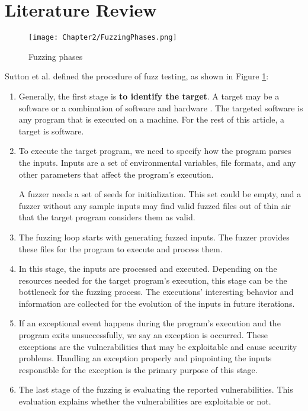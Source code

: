 \section{Literature Review} \label{sec:2.2}


\begin{figure}[!b]
    \texttt{[image: Chapter2/FuzzingPhases.png]}
    \centering
    \caption{Fuzzing phases}
    \label{fig:fuzz_phases}
\end{figure} 

Sutton et al. \cite{sutton2007fuzzing} defined the procedure of fuzz testing, as shown in Figure \ref{fig:fuzz_phases}:
\begin{enumerate}
    \item Generally, the first stage is \textbf{to identify the target}. A target may be a software or a combination of software and hardware \cite{song2019periscope}. The targeted software is any program that is executed on a machine. For the rest of this article, a target is software.
    
    \item To execute the target program, we need to specify how the program parses the inputs. Inputs are a set of environmental variables, file formats, and any other parameters that affect the program's execution.
    
    A fuzzer needs a set of seeds for initialization. This set could be empty, and a fuzzer without any sample inputs may find valid fuzzed files out of thin air \cite{out_of_thin_air} that the target program considers them as valid.
    
    \item The fuzzing loop starts with generating fuzzed inputs. The fuzzer provides these files for the program to execute and process them.

    \item In this stage, the inputs are processed and executed. Depending on the resources needed for the target program's execution, this stage can be the bottleneck for the fuzzing process. The executions' interesting behavior and information are collected for the evolution of the inputs in future iterations.

    \item If an exceptional event happens during the program's execution and the program exits unsuccessfully, we say an exception is occurred. These exceptions are the vulnerabilities that may be exploitable and cause security problems. Handling an exception properly and pinpointing the inputs responsible for the exception is the primary purpose of this stage.
    
    \item The last stage of the fuzzing is evaluating the reported vulnerabilities. This evaluation explains whether the vulnerabilities are exploitable or not.

\end{enumerate}

